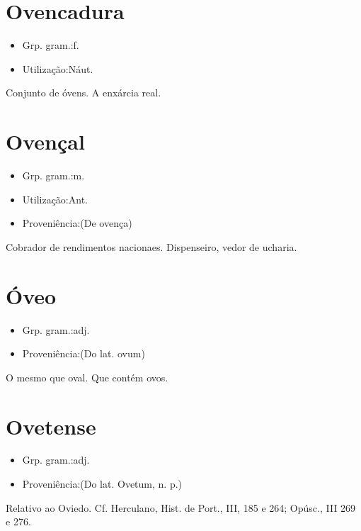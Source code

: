 \section{Ovencadura}
\begin{itemize}
\item {Grp. gram.:f.}
\end{itemize}
\begin{itemize}
\item {Utilização:Náut.}
\end{itemize}
Conjunto de óvens.
A enxárcia real.
\section{Ovençal}
\begin{itemize}
\item {Grp. gram.:m.}
\end{itemize}
\begin{itemize}
\item {Utilização:Ant.}
\end{itemize}
\begin{itemize}
\item {Proveniência:(De \textunderscore ovença\textunderscore )}
\end{itemize}
Cobrador de rendimentos nacionaes.
Dispenseiro, vedor de ucharia.
\section{Óveo}
\begin{itemize}
\item {Grp. gram.:adj.}
\end{itemize}
\begin{itemize}
\item {Proveniência:(Do lat. \textunderscore ovum\textunderscore )}
\end{itemize}
O mesmo que \textunderscore oval\textunderscore .
Que contém ovos.
\section{Ovetense}
\begin{itemize}
\item {Grp. gram.:adj.}
\end{itemize}
\begin{itemize}
\item {Proveniência:(Do lat. \textunderscore Ovetum\textunderscore , n. p.)}
\end{itemize}
Relativo ao Oviedo. Cf. Herculano, \textunderscore Hist. de Port.\textunderscore , III, 185 e 264; \textunderscore Opúsc.\textunderscore , III 269 e 276.
